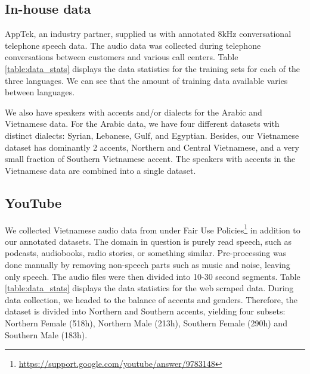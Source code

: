 

\subsection{In-house data}

AppTek, an industry partner, supplied us with annotated 8kHz conversational telephone speech data.
The audio data was collected during telephone conversations between customers and various call centers.
Table \ref{table:data_stats} displays the data statistics for the training sets for each of the three languages.
We can see that the amount of training data available varies between languages.

We also have speakers with accents and/or dialects for the Arabic and Vietnamese data.
For the Arabic data, we have four different datasets with distinct dialects: Syrian, Lebanese, Gulf, and Egyptian.
Besides, our Vietnamese dataset has dominantly 2 accents, Northern and Central Vietnamese, and a very small fraction of Southern Vietnamese accent.
The speakers with accents in the Vietnamese data are combined into a single dataset.

\subsection{YouTube}

We collected Vietnamese audio data from  under Fair Use Policies\footnote{\href{https://support.google.com/youtube/answer/9783148}{https://support.google.com/youtube/answer/9783148}} in addition to our annotated datasets.
The domain in question is purely read speech, such as podcasts, audiobooks, radio stories, or something similar.
Pre-processing was done manually by removing non-speech parts such as music and noise, leaving only speech.
The audio files were then divided into 10-30 second segments.
Table \ref{table:data_stats} displays the data statistics for the web scraped data.
During data collection, we headed to the balance of accents and genders.
Therefore, the dataset is divided into Northern and Southern accents, yielding four subsets: Northern Female (518h), Northern Male (213h), Southern Female (290h) and Southern Male (183h).



